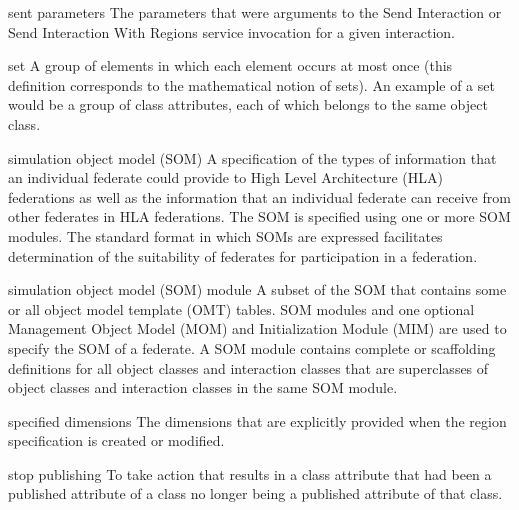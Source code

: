 \begin{definition}{sent parameters}
    The parameters that were arguments to the Send Interaction or Send Interaction With Regions service invocation for a given interaction.
\end{definition}


\begin{definition}{set}
    A group of elements in which each element occurs at most once (this definition corresponds to the mathematical notion of sets). An example of a set would be a group of class attributes, each of which belongs to the same object class.
\end{definition}

\begin{definition}{simulation object model (SOM)}
    A specification of the types of information that an individual federate could provide to High Level Architecture (HLA) federations as well as the information that an individual federate can receive from other federates in HLA federations. The SOM is specified using one or more SOM modules. The standard format in which SOMs are expressed facilitates determination of the suitability of federates for participation in a federation.
\end{definition}

\begin{definition}{simulation object model (SOM) module}
    A subset of the SOM that contains some or all object model template (OMT) tables. SOM modules and one optional Management Object Model (MOM) and Initialization Module (MIM) are used to specify the SOM of a federate. A SOM module contains complete or scaffolding definitions for all object classes and interaction classes that are superclasses of object classes and interaction classes in the same SOM module.
\end{definition}

\begin{definition}{specified dimensions}
    The dimensions that are explicitly provided when the region specification is created or modified.
\end{definition}


\begin{definition}{stop publishing}
    To take action that results in a class attribute that had been a published attribute of a class no longer being a published attribute of that class.
\end{definition}

